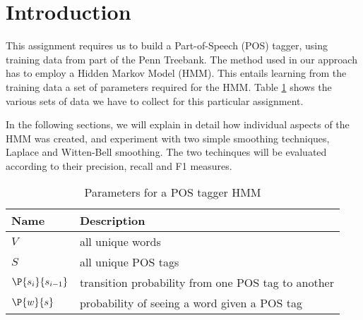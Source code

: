 \documentclass[12pt]{homework}
\title{}
\author{}
\date{}
\newcommand{\transprob}{\P{s_i}{s_{i-1}}}
\newcommand{\obsprob}{\P{w}{s}}
\begin{document}
\maketitle
{}
\section{Introduction}

This assignment requires us to build a Part-of-Speech (POS) tagger, using 
training data from part of the Penn Treebank. The method used in our approach 
has to employ a Hidden Markov Model (HMM). This entails learning from the 
training data a set of parameters required for the HMM. Table \ref{parameters} 
shows the various sets of data we have to collect for this particular 
assignment.

In the following sections, we will explain in detail how individual aspects of 
the HMM was created, and experiment with two simple smoothing techniques, 
Laplace and Witten-Bell smoothing. The two techinques will be evaluated 
according to their precision, recall and F1 measures.

\begin{table}
	\begin{center}
	\begin{tabular}{l l}
		\hline
		Name			&	Description\\
		\hline
		$V$				&	all unique words\\
		$S$				&	all unique POS tags\\
		$\transprob$	&	transition probability from one POS tag to another\\
		$\obsprob$		&	probability of seeing a word given a POS tag\\
		\hline
	\end{tabular}
	\end{center}
	\label{parameters}\caption{Parameters for a POS tagger HMM}
\end{table}
\end{document}
